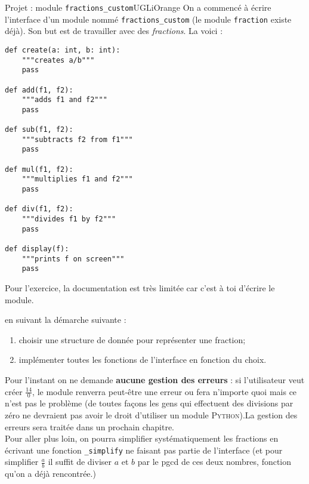 \documentclass[a4paper,12pt,french]{book}
\begin{document}
\begin{encadrecolore}{Projet : module \texttt{fractions\_custom}}{UGLiOrange}
On a commencé à écrire l'interface d'un module nommé \texttt{fractions\_custom} (le module \texttt{fraction} existe déjà). Son but est de travailler avec des \textit{fractions}.
La voici :
\begin{verbatim}
def create(a: int, b: int):
    """creates a/b"""
    pass

def add(f1, f2):
    """adds f1 and f2"""
    pass

def sub(f1, f2):
    """subtracts f2 from f1"""
    pass

def mul(f1, f2):
    """multiplies f1 and f2"""
    pass

def div(f1, f2):
    """divides f1 by f2"""
    pass

def display(f):
    """prints f on screen"""
    pass
\end{verbatim}

Pour l'exercice, la documentation est très limitée car c'est à toi d'écrire le module.

en suivant la démarche suivante :
\begin{enumerate}[--]
	\item 	choisir une structure de donnée pour représenter une fraction;
	\item 	implémenter toutes les fonctions de l'interface en fonction du choix.
\end{enumerate}

Pour l'instant on ne demande \textbf{aucune gestion des erreurs} : si l'utilisateur veut créer $\frac{14}{0}$, le module renverra peut-être une erreur ou fera n'importe quoi mais ce n'est pas le problème (de toutes façons les gens qui effectuent des divisions par zéro ne devraient pas avoir le droit d'utiliser un module \textsc{Python}).La gestion des erreurs sera traitée dans un prochain chapitre.\\

Pour aller plus loin, on pourra simplifier systématiquement les fractions en écrivant une fonction \texttt{\_simplify} ne faisant pas partie de l'interface (et pour simplifier $\frac{a}{b}$ il suffit de diviser $a$ et $b$ par le pgcd de ces deux nombres, fonction qu'on a déjà rencontrée.)\\
\end{encadrecolore}
\end{document}
